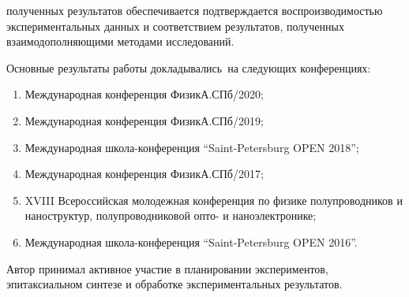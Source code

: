 {\reliability} полученных результатов обеспечивается подтверждается воспроизводимостью экспериментальных данных и соответствием результатов, полученных взаимодополняющими методами исследований.

{\probation}
Основные результаты работы докладывались~на следующих конференциях:
\begin{enumerate}[beginpenalty=10000]
  \item Международная конференция ФизикА.СПб/2020;
  \item Международная конференция ФизикА.СПб/2019;
  \item Международная школа-конференция “Saint-Petersburg OPEN 2018”;
  \item Международная конференция ФизикА.СПб/2017;
  \item XVIII Всероссийская молодежная конференция по физике полупроводников и наноструктур, полупроводниковой опто- и наноэлектронике;
  \item Международная школа-конференция “Saint-Petersburg OPEN 2016”.
\end{enumerate}

{\contribution} Автор принимал активное участие в планировании экспериментов, эпитаксиальном синтезе и обработке экспериментальных результатов.

